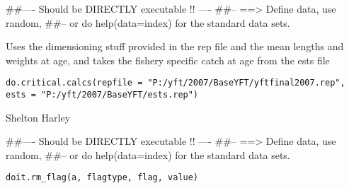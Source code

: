 \documentclass[a4paper]{book}
\begin{document}
%
\begin{Examples}
\begin{ExampleCode}
##---- Should be DIRECTLY executable !! ----
##-- ==>  Define data, use random,
##--	or do  help(data=index)  for the standard data sets.

\end{ExampleCode}
\end{Examples}
%
\begin{Description}\relax

Uses the dimensioning stuff provided in the rep file and the mean lengths and weights at age, 
and takes the fishery specific catch at age from the ests file
\end{Description}
%
\begin{Usage}
\begin{verbatim}
do.critical.calcs(repfile = "P:/yft/2007/BaseYFT/yftfinal2007.rep", ests = "P:/yft/2007/BaseYFT/ests.rep")
\end{verbatim}
\end{Usage}
%
\begin{Arguments}
\begin{ldescription}
\item[\code{repfile}] 


\item[\code{ests}] 


\end{ldescription}
\end{Arguments}
%
\begin{Author}\relax
Shelton Harley

\end{Author}
%
\begin{Examples}
\begin{ExampleCode}
##---- Should be DIRECTLY executable !! ----
##-- ==>  Define data, use random,
##--	or do  help(data=index)  for the standard data sets.

\end{ExampleCode}
\end{Examples}
%
\begin{Usage}
\begin{verbatim}
doit.rm_flag(a, flagtype, flag, value)
\end{verbatim}
\end{Usage}
\end{document}
